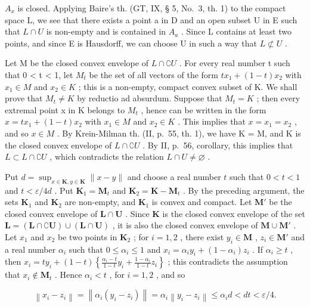 \(A_{x}\) is closed. Applying Baire's th. (GT, IX, § 5, No.~3, th. 1) to the compact space L, we see that there exists a point a in D and an open subset U in E such that \(L \cap U\) is non-empty and is contained in \(A_{a}\) . Since L contains at least two points, and since E is Hausdorff, we can choose U in such a way that \(L \not\subset U\) .

Let M be the closed convex envelope of \(L \cap \complement U\) . For every real number t such that 0 \textless{} t \textless{} 1, let \(M_{t}\) be the set of all vectors of the form \(tx_{1} + (1 - t)x_{2}\) with \(x_{1} \in M\) and \(x_{2} \in K\) ; this is a non-empty, compact convex subset of K. We shall prove that \(M_{t} \neq K\) by reductio ad absurdum. Suppose that \(M_{t} = K\) ; then every extremal point x in K belongs to \(M_{t}\) , hence can be written in the form \(x = tx_{1} + (1 - t)x_{2}\) with \(x_{1} \in M\) and \(x_{2} \in K\) . This implies that \(x = x_{1} = x_{2}\) , and so \(x \in M\) . By Krein-Milman th. (II, p.~55, th. 1), we have K = M, and K is the closed convex envelope of \(L \cap \complement U\) . By II, p.~56, corollary, this implies that \(L \subset L \cap \complement U\) , which contradicts the relation \(L \cap U \neq \varnothing\) .

Put \(d = \sup_{x \in \mathbf{K}, y \in \mathbf{K}} \| x - y \|\) and choose a real number \(t\) such that \(0 < t < 1\) and \(t < \varepsilon / 4d\) . Put \(\mathbf{K}_1 = \mathbf{M}_t\) and \(\mathbf{K}_2 = \mathbf{K} - \mathbf{M}_t\) . By the preceding argument, the sets \(\mathbf{K}_1\) and \(\mathbf{K}_2\) are non-empty, and \(\mathbf{K}_1\) is convex and compact. Let \(\mathbf{M}'\) be the closed convex envelope of \(\mathbf{L} \cap \mathbf{U}\) . Since \(\mathbf{K}\) is the closed convex envelope of the set \(\mathbf{L} = (\mathbf{L} \cap \complement \mathbf{U}) \cup (\mathbf{L} \cap \mathbf{U})\) , it is also the closed convex envelope of \(\mathbf{M} \cup \mathbf{M}'\) . Let \(x_1\) and \(x_2\) be two points in \(\mathbf{K}_2\) ; for \(i = 1, 2\) , there exist \(y_i \in \mathbf{M}\) , \(z_i \in \mathbf{M}'\) and a real number \(\alpha_i\) such that \(0 \leqslant \alpha_i \leqslant 1\) and \(x_i = \alpha_i y_i + (1 - \alpha_i) z_i\) . If \(\alpha_i \geqslant t\) , then \(x_i = ty_i + (1 - t) \left\{\frac{\alpha_i - t}{1 - t} y_i + \frac{1 - \alpha_i}{1 - t} z_i\right\}\) ; this contradicts the assumption that \(x_i \notin \mathbf{M}_t\) . Hence \(\alpha_i < t\) , for \(i = 1, 2\) , and so

\[
\left\| x _ {i} - z _ {i} \right\| = \left\| \alpha_ {i} \left(y _ {i} - z _ {i}\right) \right\| = \alpha_ {i} \left\| y _ {i} - z _ {i} \right\| \leqslant \alpha_ {i} d <   d t <   \varepsilon / 4.
\]

